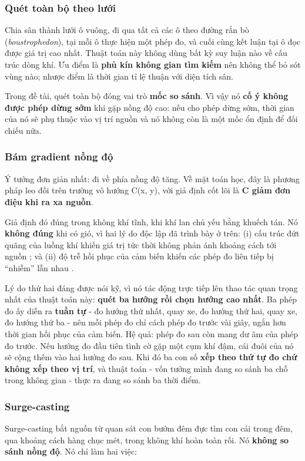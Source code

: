 \subsubsection{Quét toàn bộ theo lưới}
Chia sân thành lưới ô vuông, đi qua tất cả các ô theo đường rắn bò (\textit{boustrophedon}), tại mỗi ô thực hiện một phép đo, và cuối cùng kết luận tại ô đọc được giá trị cao nhất. Thuật toán này không dùng bất kỳ suy luận nào về cấu trúc dòng khí. Ưu điểm là \textbf{phủ kín không gian tìm kiếm} nên không thể bỏ sót vùng nào; nhược điểm là thời gian tỉ lệ thuận với diện tích sân.

Trong đề tài, quét toàn bộ đóng vai trò \textbf{mốc so sánh}. Vì vậy nó \textbf{cố ý không được phép dừng sớm} khi gặp nồng độ cao: nếu cho phép dừng sớm, thời gian của nó sẽ phụ thuộc vào vị trí nguồn và nó không còn là một mốc ổn định để đối chiếu nữa.


\subsubsection{Bám gradient nồng độ}
Ý tưởng đơn giản nhất: đi về phía nồng độ tăng. Về mặt toán học, đây là phương pháp leo đồi trên trường vô hướng C(x, y), với giả định cốt lõi là \textbf{C giảm đơn điệu khi ra xa nguồn}.

Giả định đó đúng trong không khí tĩnh, khi khí lan chủ yếu bằng khuếch tán. Nó \textbf{không đúng} khi có gió, vì hai lý do độc lập đã trình bày ở trên: (i) cấu trúc đứt quãng của luồng khí khiến giá trị tức thời không phản ánh khoảng cách tới nguồn \cite{r1}; và (ii) độ trễ hồi phục của cảm biến khiến các phép đo liên tiếp bị ``nhiễm'' lẫn nhau \cite{r3}.

Lý do thứ hai đáng được nói kỹ, vì nó tác động trực tiếp lên thao tác quan trọng nhất của thuật toán này: \textbf{quét ba hướng rồi chọn hướng cao nhất}. Ba phép đo ấy diễn ra \textbf{tuần tự} - đo hướng thứ nhất, quay xe, đo hướng thứ hai, quay xe, đo hướng thứ ba - nên mỗi phép đo chỉ cách phép đo trước vài giây, ngắn hơn thời gian hồi phục của cảm biến. Hệ quả: phép đo sau còn mang dư âm của phép đo trước. Nếu hướng đo đầu tiên tình cờ gặp một cụm khí đậm, cái đuôi của nó sẽ cộng thêm vào hai hướng đo sau. Khi đó ba con số \textbf{xếp theo thứ tự đo chứ không xếp theo vị trí}, và thuật toán - vốn tưởng mình đang so sánh ba chỗ trong không gian - thực ra đang so sánh ba thời điểm.

\subsubsection{Surge-casting}
Surge-casting bắt nguồn từ quan sát con bướm đêm đực tìm con cái trong đêm, qua khoảng cách hàng chục mét, trong không khí hoàn toàn rối. Nó \textbf{không so sánh nồng độ}. Nó chỉ làm hai việc:

